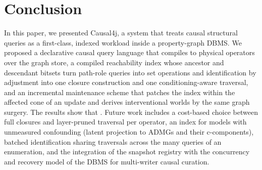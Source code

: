 \section{Conclusion}\label{sec:conclusion}

In this paper, we presented Causal4j, a system that treats causal structural
queries as a first-class, indexed workload inside a property-graph DBMS. We
proposed a declarative causal query language that compiles to physical
operators over the graph store, a compiled reachability index whose
ancestor and descendant bitsets turn path-role queries into set operations and
identification by adjustment into one closure construction and one
conditioning-aware traversal, and an incremental maintenance scheme that
patches the index within the affected cone of an update and derives
interventional worlds by the same graph surgery. The results show that
. Future work includes a
cost-based choice between full closures and layer-pruned traversal per
operator, an index for models with unmeasured confounding (latent projection
to ADMGs and their c-components), batched identification sharing traversals
across the many queries of an enumeration, and the integration of the
snapshot registry with the concurrency and recovery model of the DBMS for
multi-writer causal curation.
